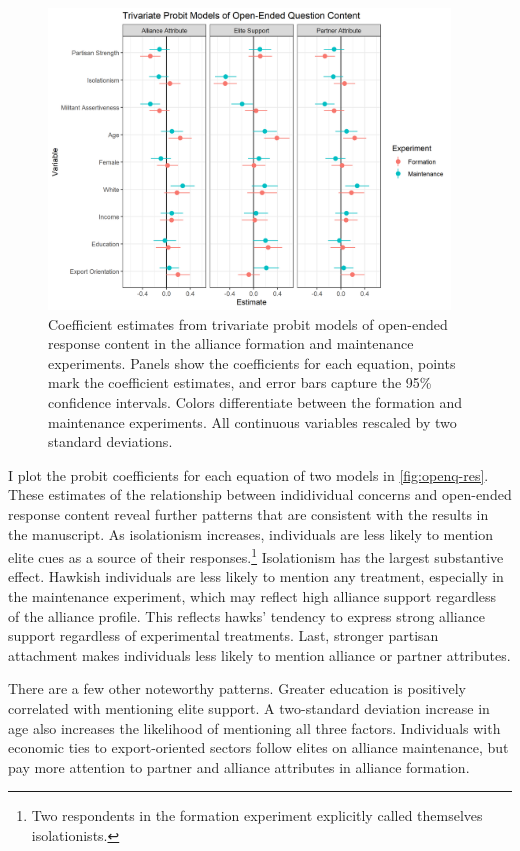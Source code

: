 \documentclass[12pt]{article}
\begin{document}
\begin{figure}
	\centering
		\includegraphics[width=0.95\textwidth]{open-questions-res.png}
	\caption{Coefficient estimates from trivariate probit models of open-ended response content in the alliance formation and maintenance experiments. Panels show the coefficients for each equation, points mark the coefficient estimates, and error bars capture the 95\% confidence intervals. Colors differentiate between the formation and maintenance experiments. All continuous variables rescaled by two standard deviations.}
	\label{fig:openq-res}
\end{figure}



I plot the probit coefficients for each equation of two models in \autoref{fig:openq-res}. 
These estimates of the relationship between indidividual concerns and open-ended response content reveal further patterns that are consistent with the results in the manuscript.
As isolationism increases, individuals are less likely to mention elite cues as a source of their responses.\footnote{Two respondents in the formation experiment explicitly called themselves isolationists.} 
Isolationism has the largest substantive effect. 
Hawkish individuals are less likely to mention any treatment, especially in the maintenance experiment, which may reflect high alliance support regardless of the alliance profile.
This reflects hawks' tendency to express strong alliance support regardless of experimental treatments.  
Last, stronger partisan attachment makes individuals less likely to mention alliance or partner attributes. 


There are a few other noteworthy patterns.
Greater education is positively correlated with mentioning elite support. 
A two-standard deviation increase in age also increases the likelihood of mentioning all three factors. 
Individuals with economic ties to export-oriented sectors follow elites on alliance maintenance, but pay more attention to partner and alliance attributes in alliance formation. 
\end{document}
